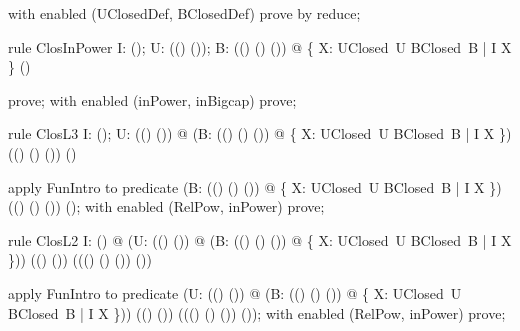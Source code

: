 \documentclass{article}
\begin{document}
\begin{zproof}
with enabled (UClosedDef, BClosedDef) prove by reduce;
\end{zproof}

\begin{theorem}{rule ClosInPower}
  \forall I: \power (\nat \fun \nat); U: \power ((\nat \fun \nat) \fun (\nat \fun \nat)); B: \power ((\nat \fun \nat) \cross (\nat \fun \nat) \fun (\nat \fun \nat)) @ \bigcap \{ X: UClosed~U \cap BClosed~B | I \subseteq X \} \in \power (\nat \fun \nat)
\end{theorem}

\begin{zproof}
prove;
with enabled (inPower, inBigcap) prove;
\end{zproof}

\begin{theorem}{rule ClosL3}
  \forall I: \power (\nat \fun \nat); U: \power ((\nat \fun \nat) \fun (\nat \fun \nat)) @ (\lambda B: \power ((\nat \fun \nat) \cross (\nat \fun \nat) \fun (\nat \fun \nat)) @ \bigcap \{ X: UClosed~U \cap BClosed~B | I \subseteq X \}) \in \power ((\nat \fun \nat) \cross (\nat \fun \nat) \fun (\nat \fun \nat)) \fun \power (\nat \fun \nat)
\end{theorem}

\begin{zproof}
apply FunIntro to predicate (\lambda B: \power ((\nat \fun \nat) \cross (\nat \fun \nat) \fun (\nat \fun \nat)) @ \bigcap \{ X: UClosed~U \cap BClosed~B | I \subseteq X \}) \in \power ((\nat \fun \nat) \cross (\nat \fun \nat) \fun (\nat \fun \nat)) \fun \power (\nat \fun \nat);
with enabled (RelPow, inPower) prove;
\end{zproof}

\begin{theorem}{rule ClosL2}
  \forall I: \power (\nat \fun \nat) @ (\lambda U: \power ((\nat \fun \nat) \fun (\nat \fun \nat)) @ (\lambda B: \power ((\nat \fun \nat) \cross (\nat \fun \nat) \fun (\nat \fun \nat)) @ \bigcap \{ X: UClosed~U \cap BClosed~B | I \subseteq X \})) \in \power ((\nat \fun \nat) \fun (\nat \fun \nat)) \fun (\power ((\nat \fun \nat) \cross (\nat \fun \nat) \fun (\nat \fun \nat)) \fun \power (\nat \fun \nat))
\end{theorem}

\begin{zproof}
apply FunIntro to predicate (\lambda U: \power ((\nat \fun \nat) \fun (\nat \fun \nat)) @ (\lambda B: \power ((\nat \fun \nat) \cross (\nat \fun \nat) \fun (\nat \fun \nat)) @ \bigcap \{ X: UClosed~U \cap BClosed~B | I \subseteq X \})) \in \power ((\nat \fun \nat) \fun (\nat \fun \nat)) \fun (\power ((\nat \fun \nat) \cross (\nat \fun \nat) \fun (\nat \fun \nat)) \fun \power (\nat \fun \nat));
with enabled (RelPow, inPower) prove;
\end{zproof}
\end{document}
